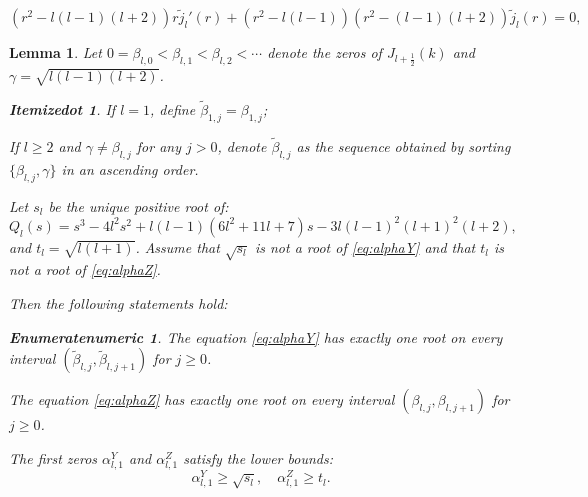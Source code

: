 \documentclass[10pt,a4paper]{amsart}
\newtheorem{lemma}{Lemma}
\newtheorem{itemizedot}{Itemizedot}
\newtheorem{enumeratenumeric}{Enumeratenumeric}
\begin{document}
  \begin{equation}
    (r^2 - l (l - 1) (l + 2)) r \tilde{j}_l' (r) + (r^2 - l (l - 1))  (r^2 -
    (l - 1) (l + 2))  \tilde{j}_l (r) = 0, \label{eq:alphaY}
  \end{equation}

\begin{lemma}
  \label{lem:zeros}Let $0 = \beta_{l, 0} < \beta_{l, 1} < \beta_{l, 2} <
  \cdots$ denote the zeros of $J_{l + \frac{1}{2}} (k)$ and $\gamma = \sqrt{l
  (l - 1)  (l + 2)}$.
  \begin{itemizedot}
    \item If $l = 1$, define $\tilde{\beta}_{1, j} = \beta_{1, j}$;
    
    \item If $l \geqslant 2$ and $\gamma \neq \beta_{l, j}$ for any $j > 0$,
    denote $\tilde{\beta}_{l, j}$ as the sequence obtained by sorting
    $\{\beta_{l, j}, \gamma\}$ in an ascending order.
  \end{itemizedot}
  Let $s_l$ be the unique positive root of:
  \[ Q_l (s) = s^3 - 4 l^2 s^2 + l (l - 1)  (6 l^2 + 11 l + 7) s - 3 l (l -
     1)^2  (l + 1)^2  (l + 2), \]
  and $t_l = \sqrt{l (l + 1)}$. Assume that $\sqrt{s_l}$ is not a root of
  \eqref{eq:alphaY} and that $t_l$ is not a root of \eqref{eq:alphaZ}.
  
  Then the following statements hold:
  \begin{enumeratenumeric}
    \item The equation \eqref{eq:alphaY} has exactly one root on every
    interval $(\tilde{\beta}_{l, j}, \tilde{\beta}_{l, j + 1})$ for $j
    \geqslant 0$.
    
    \item The equation \eqref{eq:alphaZ} has exactly one root on every
    interval $(\beta_{l, j}, \beta_{l, j + 1})$ for $j \geqslant 0$.
    
    \item The first zeros $\alpha_{l, 1}^Y$ and $\alpha_{l, 1}^Z$ satisfy the
    lower bounds:
    \[ \alpha_{l, 1}^Y \geqslant \sqrt{s_l}, \quad \alpha_{l, 1}^Z \geqslant
       t_l . \]
  \end{enumeratenumeric}
\end{lemma}
\end{document}
